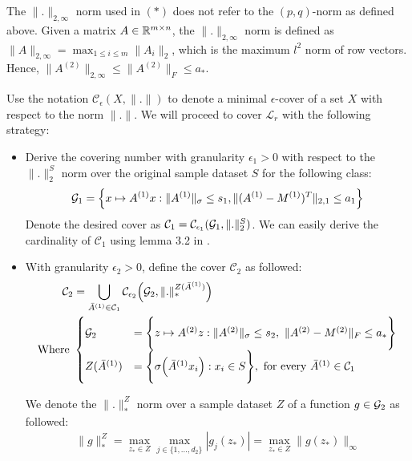 \noindent The $\|.\|_{2,\infty}$ norm used in $(*)$ does not refer to the $(p, q)$-norm as defined above. Given a matrix $A\in\mathbb{R}^{m\times n}$, the $\|.\|_{2, \infty}$ norm is defined as $\|A\|_{2, \infty}=\max_{1\le i \le m}\|A_i\|_2$, which is the maximum $l^2$ norm of row vectors. Hence, $\|A^{(2)}\|_{2,\infty}\le \|A^{(2)}\|_F\le a_*$.

\noindent\newline Use the notation $\mathcal{C}_\epsilon(X, \|.\|)$ to denote a minimal $\epsilon$-cover of a set $X$ with respect to the norm $\|.\|$. We will proceed to cover $\mathcal{L}_r$ with the following strategy:

\begin{itemize}
    \item Derive the covering number with granularity $\epsilon_1 > 0$ with respect to the $\|.\|_2^S$ norm over the original sample dataset $S$ for the following class: 
    \begin{align*}
        \mathcal{G}_1 = \Big\{ 
            x \mapsto A^{(1)}x : \|A^{(1)}\|_\sigma \le s_1, \|(A^{(1)} - M^{(1)})^T\|_{2, 1} \le a_1
         \Big\} 
    \end{align*}
    Denote the desired cover as $\mathcal{C}_1 = \mathcal{C}_{\epsilon_1}({\mathcal{G}_1}, \|.\|_2^S)$. We can easily derive the cardinality of $\mathcal{C}_1$ using lemma 3.2 in \cite{article:bartlett}.

    \item With granularity $\epsilon_2 > 0$, define the cover $\mathcal{C}_2$ as followed:
    \begin{align*}
       \mathcal{C}_2 &= \bigcup_{\bar A^{(1)} \in \mathcal{C}_1} \mathcal{C}_{\epsilon_2} \bigRound{
            \G_2, \|.\|_*^{Z(\bar A^{(1)})}
       } \\
       \text{Where } &\begin{cases}
            \G_2 &= \biggCurl{
                    z \mapsto A^{(2)}z : \|A^{(2)}\|_\sigma \le s_2, \ \|A^{(2)} - M^{(2)}\|_F \le a_*
            } \\
            Z(\bar A^{(1)}) &= \biggCurl{ \sigma\bigRound{\bar A^{(1)}x_i} : x_i \in S }, \ \text{for every } \bar A^{(1)}\in\mathcal{C}_1
       \end{cases}
    \end{align*}

    We denote the $\|.\|_*^Z$ norm over a sample dataset $Z$ of a function $g\in\mathcal{G}_2$ as followed:
    \begin{align*}
        \|g\|_*^Z = \max_{z_* \in Z}\max_{j\in\{1, \dots, d_2\}} |g_j(z_*)| = \max_{z_* \in Z} \|g(z_*)\|_\infty
    \end{align*}


\end{itemize}
